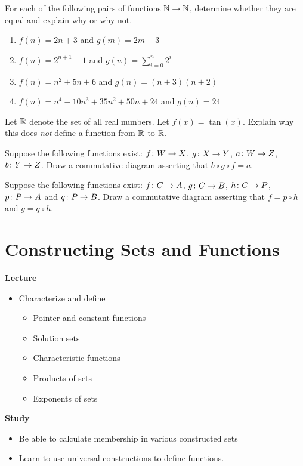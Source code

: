 \begin{exercises}
\begin{nextexercise}
\item  For each of the following pairs of functions $\mathbb N\to\mathbb N$, determine whether they are equal and explain why or why not.
  \begin{enumerate}
  \item $f(n) = 2n + 3$ and $g(m) = 2m + 3$
  \item $f(n) = 2^{n+1} - 1$ and $g(n) = \sum_{i=0}^n2^i$
  \item $f(n) =  n^2 + 5n + 6$ and $g(n) = (n+3)(n+2)$
  \item $f(n) = n^4 - 10n^3 + 35n^2 + 50n + 24$ and $g(n) = 24$
  \end{enumerate}
\item Let $\mathbb R$ denote the set of all real numbers. Let $f(x) = \tan(x)$.
Explain why this does \emph{not} define a function from $\mathbb R$ to $\mathbb R$.
\item Suppose the following functions exist: ${f}\colon{W}\to{X}$, ${g}\colon{X}\to{Y}$, ${a}\colon{W}\to{Z}$, ${b}\colon{Y}\to{Z}$. 
  Draw a commutative diagram asserting that $b\circ g\circ f = a$.
\item Suppose the following functions exist: ${f}\colon{C}\to{A}$, ${g}\colon{C}\to{B}$, ${h}\colon{C}\to{P}$, ${p}\colon{P}\to{A}$ and ${q}\colon{P}\to{B}$.
 Draw a commutative diagram asserting that $f=p\circ h$ and $g=q\circ h$.
\end{nextexercise}
\end{exercises}

\chapter{Constructing Sets and Functions}

\begin{goals}
	\noindent\textbf{Lecture}
	\begin{itemize}
	\item Characterize and define
		 \begin{itemize}
			 \item Pointer and constant functions
			\item Solution sets
			\item Characteristic functions
			\item Products of sets
			\item Exponents of sets
		 \end{itemize}
	\end{itemize}

	\noindent\textbf{Study}
	\begin{itemize}
	\item Be able to calculate membership in various constructed sets 
	\item Learn to use universal constructions to define functions. 
	\end{itemize}
\end{goals}

